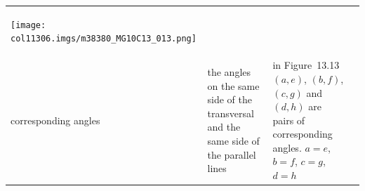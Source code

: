 \begin{table}[H]
\begin{center}
\begin{xtabular*}{\mytablewidth}[t]{|p{3cm}|p{3cm}|p{3cm}|p{20\mystarwidth}|}
\label{m38380*id316923}
    \begin{center}
    \label{m38380*id316923!!!underscore!!!media}\label{m38380*id316923!!!underscore!!!printimage}\texttt{[image: col11306.imgs/m38380\_MG10C13\_013.png]} %
        
      \vspace{2pt}
    \vspace{.1in}
    
    \end{center}



    \addtocounter{footnote}{-0}
    
     \tabularnewline{}
    
    
        corresponding angles &
    
    
        the angles on the same side of the transversal and the same side of the parallel lines &
    
    
        in Figure~13.13 \begin{math}\left(a,e\right)\end{math}, \begin{math}\left(b,f\right)\end{math}, \begin{math}\left(c,g\right)\end{math} and \begin{math}\left(d,h\right)\end{math} are pairs of corresponding angles.  \begin{math}a=e\end{math}, \begin{math}b=f\end{math}, \begin{math}c=g\end{math}, \begin{math}d=h\end{math} &
    

\end{xtabular*}
\end{center}
\end{table}
